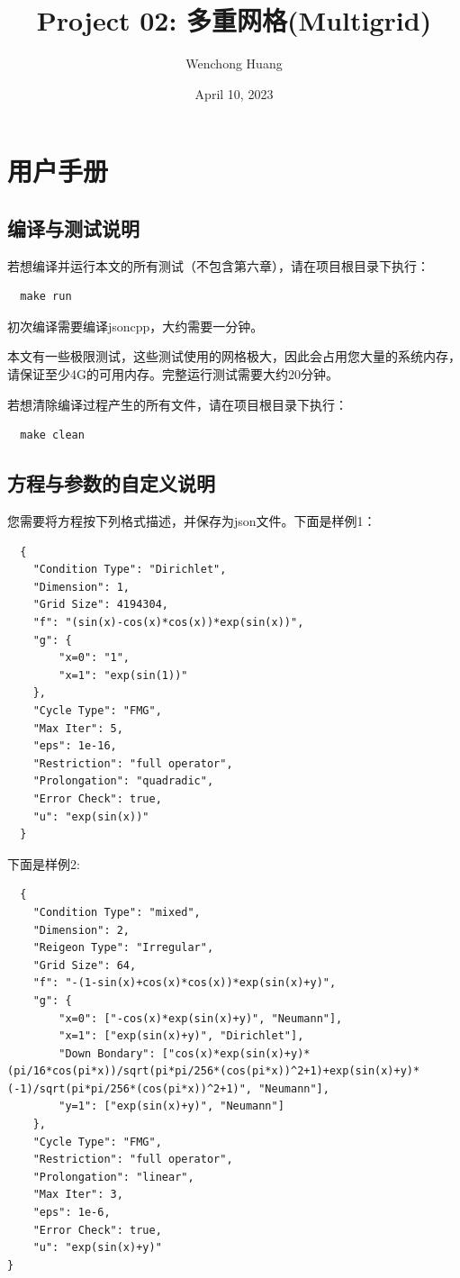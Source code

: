 \documentclass[lang=cn,10pt]{elegantbook}
\title{Project 02: 多重网格(Multigrid)}
\author{Wenchong Huang}
\date{April 10, 2023}
\begin{document}
\maketitle
\frontmatter

\tableofcontents

\mainmatter

\chapter{用户手册}

\section{编译与测试说明}

若想编译并运行本文的所有测试（不包含第六章），请在项目根目录下执行：
\begin{lstlisting}
  make run
\end{lstlisting}

初次编译需要编译jsoncpp，大约需要一分钟。

本文有一些极限测试，这些测试使用的网格极大，因此会占用您大量的系统内存，请保证至少4G的可用内存。完整运行测试需要大约20分钟。

若想清除编译过程产生的所有文件，请在项目根目录下执行：
\begin{lstlisting}
  make clean
\end{lstlisting}

\section{方程与参数的自定义说明}

您需要将方程按下列格式描述，并保存为json文件。下面是样例1：
\begin{lstlisting}
  {
    "Condition Type": "Dirichlet",
    "Dimension": 1,
    "Grid Size": 4194304,
    "f": "(sin(x)-cos(x)*cos(x))*exp(sin(x))",
    "g": {
        "x=0": "1",
        "x=1": "exp(sin(1))"
    },
    "Cycle Type": "FMG",
    "Max Iter": 5,
    "eps": 1e-16,
    "Restriction": "full operator",
    "Prolongation": "quadradic",
    "Error Check": true,
    "u": "exp(sin(x))"
  }
\end{lstlisting}

下面是样例2:
\begin{lstlisting}
  {
    "Condition Type": "mixed",
    "Dimension": 2,
    "Reigeon Type": "Irregular",
    "Grid Size": 64,
    "f": "-(1-sin(x)+cos(x)*cos(x))*exp(sin(x)+y)",
    "g": {
        "x=0": ["-cos(x)*exp(sin(x)+y)", "Neumann"],
        "x=1": ["exp(sin(x)+y)", "Dirichlet"],
        "Down Bondary": ["cos(x)*exp(sin(x)+y)*(pi/16*cos(pi*x))/sqrt(pi*pi/256*(cos(pi*x))^2+1)+exp(sin(x)+y)*(-1)/sqrt(pi*pi/256*(cos(pi*x))^2+1)", "Neumann"],
        "y=1": ["exp(sin(x)+y)", "Neumann"]
    },
    "Cycle Type": "FMG",
    "Restriction": "full operator",
    "Prolongation": "linear",
    "Max Iter": 3,
    "eps": 1e-6,
    "Error Check": true,
    "u": "exp(sin(x)+y)"
}
\end{lstlisting}
\end{document}
